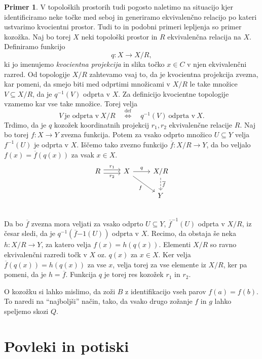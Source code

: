 \documentclass[12pt,a4paper]{book}
\theoremstyle{definition}
\theoremstyle{plain}
\theoremstyle{definition}
\newtheorem{primer}{Primer}[section]
\theoremstyle{remark}
\begin{document}
\begin{primer}
V topoloških prostorih tudi pogosto naletimo na situacijo kjer identificiramo neke točke med seboj in generiramo ekvivalenčno relacijo po kateri ustvarimo kvocientni prostor. Tudi to in podobni primeri lepljenja so primer kozožka. Naj bo torej $X$ neki topološki prostor in $R$ ekvivalenčna relacija na $X$. Definiramo funkcijo
$$ q : X \to X/R,$$
ki jo imenujemo \emph{kvocientna projekcija} in slika točko $x \in C$ v njen ekvivalenčni razred. Od topologije $X/R$ zahtevamo vsaj to, da je kvocientna projekcija zvezna, kar pomeni, da smejo biti med odprtimi množicami v $X/R$ le take množice $V \subseteq X/R$, da je $q^{-1}(V)$ odprta v $X$. Za definicijo kvocientne topologije vzamemo kar vse take množice. Torej velja
$$V \ \text{je odprta v} \ X/R \quad \overset{\text{def}}{\Leftrightarrow} \quad q^{-1}(V) \ \text{odprta v} \ X.$$
Trdimo, da je $q$ kozožek koordinatnih projekcij $r_1,r_2$ ekvivalenčne relacije $R$.
Naj bo torej $f : X \to Y$ zvezna funkcija. Potem za vsako odprto množico $U \subseteq Y$ velja $f^{-1}(U)$ je odprta v $X$. Iščemo tako zvezno funkcijo $\overline{f} : X/R \to Y$, da bo veljalo $f(x) = \overline{f}(q(x))$ za vsak $x \in X$.
$$\begin{tikzcd}
R \ar[r, shift left, "r_1"] \ar[r, shift right, "r_2"'] & X \ar[r, "q"] \ar[dr, "f"'] & X/R \ar[d, dashed, "\overline{f}"] \\
& & Y \\
\end{tikzcd}$$
Da bo $\overline{f}$ zvezna mora veljati za vsako odprto $U \subseteq Y$, $\overline{f}^{-1}(U)$ odprta v $X/R$, iz česar sledi, da je $q^{-1}(\overline{f}{-1}(U))$ odprta v $X$. Recimo, da obstaja še neka $h : X/R \to Y$, za katero velja $f(x) = h(q(x))$. Elementi $X/R$ so ravno ekvivalenčni razredi točk v $X$ oz. $q(x)$ za $x \in X$. Ker velja $\overline{f}(q(x)) = h(q(x))$ za vse $x$, velja torej za vse elemente iz $X/R$, ker pa pomeni, da je $h = \overline{f}$. Funkcija $q$ je torej res kozožek $r_1$ in $r_2$.

\end{primer}

O kozožku si lahko mislimo, da zoži $B$ z identifikacijo vseh parov $f(a) = f(b)$. To naredi na "`najboljši"' način, tako, da vsako drugo zožanje $f$ in $g$ lahko speljemo skozi $Q$.


\section{Povleki in potiski}
\end{document}
